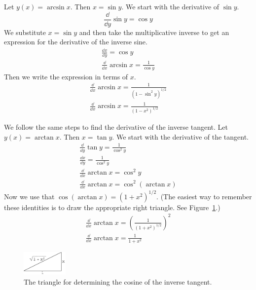 \begin{Solution}
  \label{solution d/dx arcsin x}
  Let $y(x) = \arcsin x$.  Then $x = \sin y$.  We start with the derivative 
  of $\sin y$.
  \[
  \frac{\dd}{\dd y} \sin y = \cos y
  \]
  We substitute $x = \sin y$ and then take the multiplicative inverse to 
  get an expression for the derivative of the inverse sine.
  \begin{gather*}
    \frac{\dd x}{\dd y} = \cos y
    \\
    \frac{\dd}{\dd x} \arcsin x = \frac{1}{\cos y} 
  \end{gather*}
  Then we write the expression in terms of $x$.
  \begin{gather*}
    \frac{\dd}{\dd x} \arcsin x = \frac{1}{(1 - \sin^2 y)^{1/2}} 
    \\
    \boxed{
      \frac{\dd}{\dd x} \arcsin x = \frac{1}{(1 - x^2)^{1/2}}
    }
  \end{gather*}

  We follow the same steps to find the derivative of the inverse tangent.
  Let $y(x) = \arctan x$.  Then $x = \tan y$.  We start with the derivative 
  of the tangent.
  \begin{gather*}
    \frac{\dd}{\dd y} \tan y = \frac{1}{\cos^2 y}
    \\
    \frac{\dd x}{\dd y} = \frac{1}{\cos^2 y}
    \\
    \frac{\dd}{\dd x} \arctan x = \cos^2 y
    \\
    \frac{\dd}{\dd x} \arctan x = \cos^2 (\arctan x)
  \end{gather*}
  Now we use that $\cos(\arctan x) = (1 + x^2)^{1/2}$.  
  (The easiest way to remember these identities is to draw the 
  appropriate right triangle.  See Figure~\ref{figure cosarctanx}.)
  \begin{gather*}
    \frac{\dd}{\dd x} \arctan x = \left( \frac{1}{(1+x^2)^{1/2}} \right)^2
    \\
    \boxed{
      \frac{\dd}{\dd x} \arctan x = \frac{1}{1 + x^2}
    }
  \end{gather*}

  \begin{figure}[tb]
    \begin{center}
      \includegraphics[width=0.2\textwidth]{calculus/differential/cosarctanx}
    \end{center}
    \caption{The triangle for determining the cosine of the inverse tangent.}
    \label{figure cosarctanx}
  \end{figure}
\end{Solution}











